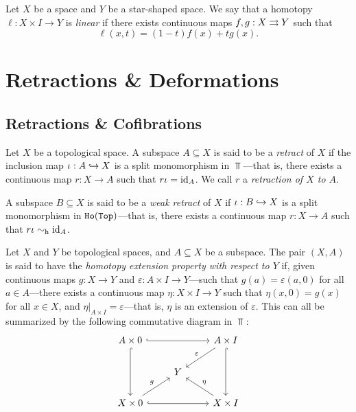 \begin{definition}
    \label{def:linear-homotopy}
    Let \(X\) be a space and \(Y\) be a star-shaped space. We say that a homotopy
    \(\ell: X \times I \to Y\) is \emph{linear} if there exists continuous maps
    \(f, g: X \rightrightarrows Y\) such that
    \[
        \ell(x, t) = (1 - t) f(x) + t g(x).
    \]
\end{definition}

\section{Retractions \& Deformations}

\subsection{Retractions \& Cofibrations}

\begin{definition}[Retract]
    \label{def:retract}
    Let \(X\) be a topological space. A subspace \(A \subseteq X\) is said to be a
    \emph{retract} of \(X\) if the inclusion map \(\iota: A \hookrightarrow X\) is a split
    monomorphism in \(\Top\)---that is, there exists a continuous map
    \(r: X \to A\) such that \(r \iota = \operatorname{id}_A\). We call \(r\) a \emph{retraction
        of \(X\) to \(A\)}.

    A subspace \(B \subseteq X\) is said to be a \emph{weak retract} of \(X\) if
    \(\iota: B \hookrightarrow X\) is a split monomorphism in \({\texttt{Ho}(\texttt{Top})}\)---that is, there
    exists a continuous map \(r: X \to A\) such that \(r \iota \sim_{\text{h}} \operatorname{id}_A\).
\end{definition}

\begin{definition}
    \label{def:homotopy-extension-property}
    Let \(X\) and \(Y\) be topological spaces, and \(A \subseteq X\) be a
    subspace. The pair \((X, A)\) is said to have the \emph{homotopy extension
        property with respect to \(Y\)} if, given continuous maps \(g: X \to Y\) and
    \(\varepsilon: A \times I \to Y\)---such that \(g(a) = \varepsilon(a, 0)\) for
    all \(a \in A\)---there exists a continuous map \(\eta: X \times I \to Y\) such
    that \(\eta(x, 0) = g(x)\) for all \(x \in X\), and
    \(\eta|_{A \times I} = \varepsilon\)---that is, \(\eta\) is an extension of
    \(\varepsilon\). This can all be summarized by the following commutative diagram
    in \(\Top\):
    \[
        \begin{tikzcd}
            A \times 0 \ar[rr, hook] \ar[dd, hook]
            & &A \times I \ar[dd, hook] \ar[ld, "\varepsilon"'] \\
            &Y & \\
            X \times 0 \ar[rr, hook] \ar[ru, "g"]
            & &X \times I \ar[lu, "\eta"']
        \end{tikzcd}
    \]
\end{definition}

